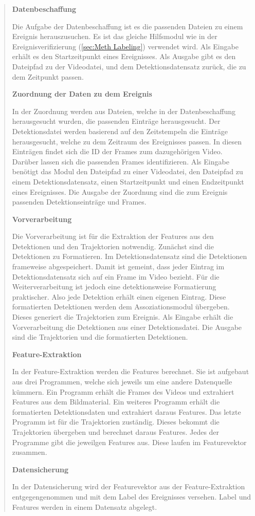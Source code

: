 \begin{quote}
\par
\textbf{Datenbeschaffung}\par
Die Aufgabe der Datenbeschaffung ist es die passenden Dateien zu einem Ereignis herauszusuchen. Es ist das gleiche Hilfsmodul wie in der Ereignisverifizierung (\ref{sec:Meth Labeling}) verwendet wird. Als Eingabe erhält es den Startzeitpunkt eines Ereignisses. Als Ausgabe gibt es den Dateipfad zu der Videodatei, und dem Detektionsdatensatz zurück, die zu dem Zeitpunkt passen. \dubpar

\textbf{Zuordnung der Daten zu dem Ereignis}\par
In der Zuordnung werden aus Dateien, welche in der Datenbeschaffung herausgesucht wurden, die passenden Einträge herausgesucht. Der Detektionsdatei werden basierend auf den Zeitstempeln die Einträge herausgesucht, welche zu dem Zeitraum des Ereignisses passen. In diesen Einträgen findet sich die ID der Frames zum dazugehörigen Video. Darüber lassen sich die passenden Frames identifizieren. Als Eingabe benötigt das Modul den Dateipfad zu einer Videodatei, den Dateipfad zu einem Detektionsdatensatz, einen Startzeitpunkt und einen Endzeitpunkt eines Ereignisses. Die Ausgabe der Zuordnung sind die zum Ereignis passenden Detektionseinträge und Frames. \dubpar

\textbf{Vorverarbeitung}\par
Die Vorverarbeitung ist für die Extraktion der Features aus den Detektionen und den Trajektorien notwendig. Zunächst sind die Detektionen zu Formatieren. Im Detektionsdatensatz sind die Detektionen frameweise abgespeichert. Damit ist gemeint, dass jeder Eintrag im Detektionsdatensatz sich auf ein Frame im Video bezieht. Für die Weiterverarbeitung ist jedoch eine detektionsweise Formatierung praktischer. Also jede Detektion erhält einen eigenen Eintrag. Diese formatierten Detektionen werden dem Assoziationsmodul übergeben. Dieses generiert die Trajektorien zum Ereignis. Als Eingabe erhält die Vorverarbeitung die Detektionen aus einer Detektionsdatei. Die Ausgabe sind die Trajektorien und die formatierten Detektionen. \dubpar

\textbf{Feature-Extraktion}\par
In der Feature-Extraktion werden die Features berechnet. Sie ist aufgebaut aus drei Programmen, welche sich jeweils um eine andere Datenquelle kümmern. Ein Programm erhält die Frames des Videos und extrahiert Features aus dem Bildmaterial. Ein weiteres Programm erhält die formatierten Detektionsdaten und extrahiert daraus Features. Das letzte Programm ist für die Trajektorien zuständig. Dieses bekommt die Trajektorien übergeben und berechnet daraus Features. Jedes der Programme gibt die jeweilgen Features aus. Diese laufen im Featurevektor zusammen. \dubpar

\textbf{Datensicherung}\par
In der Datensicherung wird der Featurevektor aus der Feature-Extraktion entgegengenommen und mit dem Label des Ereignisses versehen. Label und Features werden in einem Datensatz abgelegt. 

\end{quote}

